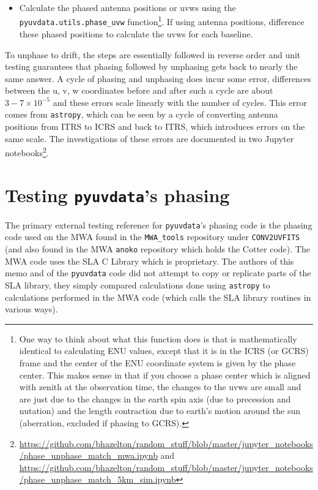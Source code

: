 \documentclass[11pt, oneside]{article}   	%
\begin{document}
\begin{itemize}
\item{Calculate the phased antenna positions or uvws using the \verb!pyuvdata.utils.phase_uvw! function\footnote{One way to think about what this function does is that is mathematically identical to calculating ENU values, except that it is in the ICRS (or GCRS) frame and the center of the ENU coordinate system is given by the phase center. This makes sense in that if you choose a phase center which is aligned with zenith at the observation time, the changes to the uvws are small and are just due to the changes in the earth spin axis (due to precession and nutation) and the length contraction due to earth's motion around the sun (aberration, excluded if phasing to GCRS).}. If using antenna positions, difference these phased positions to calculate the uvws for each baseline.}
\end{itemize}

To unphase to drift, the steps are essentially followed in reverse order and unit testing guarantees that phasing followed by unphasing gets back to nearly the same answer. A cycle of phasing and unphasing does incur some error, differences between the u, v, w coordinates before and after such a cycle are about ${3-7 \times 10^{-5}}$ and these errors scale linearly with the number of cycles. This error comes from \texttt{astropy}, which can be seen by a cycle of converting antenna positions from ITRS to ICRS and back to ITRS, which introduces errors on the same scale. The investigations of these errors are documented in two Jupyter notebooks\footnote{\url{https://github.com/bhazelton/random_stuff/blob/master/jupyter_notebooks/phase_unphase_match_mwa.ipynb} and \url{https://github.com/bhazelton/random_stuff/blob/master/jupyter_notebooks/phase_unphase_match_5km_sim.ipynb}}.

\section{Testing \texttt{pyuvdata}'s phasing}

The primary external testing reference for \texttt{pyuvdata}'s phasing code is the phasing code used on the MWA found in the \verb!MWA_tools! repository under \texttt{CONV2UVFITS} (and also found in the MWA \texttt{anoko} repository which holds the Cotter code). The MWA code uses the SLA C Library which is proprietary. The authors of this memo and of the \texttt{pyuvdata} code did not attempt to copy or replicate parts of the SLA library, they simply compared calculations done using \texttt{astropy} to calculations performed in the MWA code (which calls the SLA library routines in various ways).
\end{document}
